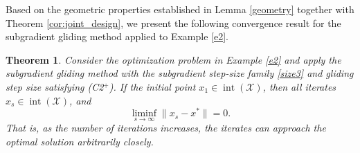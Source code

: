 \documentclass[sn-mathphys]{JORSC-jnl}%
\theoremstyle{thmstyleone}%
\newtheorem{theorem}{Theorem}[section]%
\theoremstyle{thmstylethree}%
\begin{document}
Based on the geometric properties established in Lemma \ref{geometry} together with Theorem \ref{cor:joint_design}, we present the following convergence result for the subgradient gliding method applied to Example \ref{e2}.

\begin{theorem}\label{convergence_analysis}
	Consider the optimization problem in Example \ref{e2} and apply the subgradient gliding method with the subgradient step-size family \eqref{size3} and gliding step size satisfying (C2$^+$). If the initial point $x_1 \in \operatorname{int}(\mathcal{X})$, then all iterates $x_s \in \operatorname{int}(\mathcal{X})$, and
	\begin{equation*}
		\liminf_{s \to \infty} \|x_s - x^*\| = 0.
	\end{equation*}
	That is, as the number of iterations increases, the iterates can approach the optimal solution arbitrarily closely.
\end{theorem}
\end{document}
